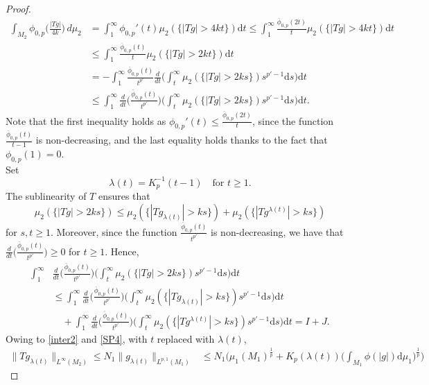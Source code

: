 \documentclass[leqno,11pt]{amsart}%
\numberwithin{equation}{section}
\def\d{\mathrm{d}}
\theoremstyle{definition}
\numberwithin{equation}{section}
\begin{document}
\begin{proof}
   \begin{align}
       \label{SP6}
       \int_{M_2}    \phi_{0,p}\Big(\frac{|Tg|}{4k}\Big)\, d\mu_2 & = \int_1^\infty    \phi_{0,p}'(t) \mu_2(\{|Tg|>4kt\})\d t \leq 
       \int_1^\infty  \frac{\overline  \phi_{0,p}(2t)}t \mu_2(\{|Tg|>4kt\})\d t
       \\ \nonumber &
\leq  \int_1^\infty  \frac{\overline  \phi_{0,p}(t)}t \mu_2(\{|Tg|>2kt\})\d t
     \\  \nonumber &  = - \int_1^\infty \frac{ \overline \phi_{0,p}(t)}{t^{p'}} \frac{d}{dt}\bigg(\int_t^\infty \mu_2(\{|Tg|>2ks\})s^{p'-1}\d s\bigg)\d t
     \\  \nonumber &  \leq
     \int_1^\infty \frac{d}{dt}\bigg(\frac{\overline  \phi_{0,p}(t)}{t^{p'}} \bigg)\bigg(\int_t^\infty \mu_2(\{|Tg|>2ks\})s^{p'-1}\d s\bigg)\d t.
   \end{align}
  Note that the first inequality holds as $ \phi_{0,p}'(t)\le\frac{\overline \phi_{0,p}(2t)}{t}$, since the function $\frac{\overline \phi_{0,p}(t)}{t-1}$ is non-decreasing, and    the last equality  holds thanks to the fact that $\phi_{0,p}(1)=0$.
\\Set
   $$\lambda (t)= K_p^{-1}(t-1) \quad \text{for $t \geq 1$.} $$
   The sublinearity of $T$ ensures that
   $$\mu_2(\{|Tg|>2ks\}) \leq \mu_2(\{|Tg_{\lambda(t)}|>ks\})+ \mu_2(\{|Tg^{\lambda(t)}|>ks\})$$
   for   $s,t\geq 1$. Moreover, since the function $\frac{ \overline \phi_{0,p}(t)}{t^{p'}}$ is non-decreasing, we have that $\frac{d}{dt}\Big(\frac{ \overline \phi_{0,p}(t)}{t^{p'}}\Big) \geq 0$ for $t \geq 1$. Hence,
   \begin{align}
       \label{SP7}
        \int_1^\infty & \frac{d}{dt}\bigg(\frac{ \overline \phi_{0,p}(t)}{t^{p'}} \bigg)\bigg(\int_t^\infty \mu_2(\{|Tg|>2ks\})s^{p'-1}\d s\bigg)\d t 
       \\ \nonumber & \leq 
 \int_1^\infty \frac{d}{dt}\bigg(\frac{\overline  \phi_{0,p}(t)}{t^{p'}} \bigg)\bigg(\int_t^\infty \mu_2(\{|Tg_{\lambda(t)}|>ks\})s^{p'-1}\d s\bigg)\d t 
 \\ \nonumber & 
      \quad + \int_1^\infty \frac{d}{dt}\bigg(\frac{ \overline \phi_{0,p}(t)}{t^{p'}} \bigg)\bigg(\int_t^\infty \mu_2(\{|Tg^{\lambda(t)}|>ks\})s^{p'-1}\d s\bigg)\d t = I+J.
   \end{align}
   Owing to \eqref{inter2} and \eqref{SP4}, with $t$ replaced with $\lambda (t)$, 
   \begin{align}
       \label{SP8}
\|Tg_{\lambda(t)}\|_{L^\infty(M_2)}\leq N_1\|g_{\lambda(t)}\|_{L^{p,1}(M_1)}&\leq N_1\bigg(\mu_1(M_1)^{\frac 1p} + K_p(\lambda (t)) \bigg(\int_{M_1}\phi(|g|)\d \mu_1\bigg)^{\frac 1p}\bigg)

\end{align}
\end{proof}
\end{document}
